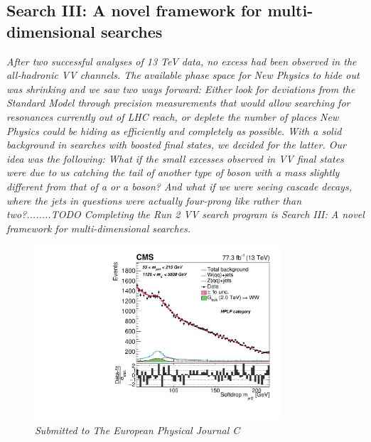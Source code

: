 \vspace*{\fill}


\clearpage

\clearpage

\vspace*{\fill}
\begin{centering}
\section{Search III: A novel framework for multi-dimensional searches}
\label{searchIII}
\textit{
After two successful analyses of 13 TeV data, no excess had been observed in the all-hadronic VV channels. The available phase space for New Physics to hide out was shrinking and we saw two ways forward: Either look for deviations from the Standard Model through precision measurements that would allow searching for resonances currently out of LHC reach, or deplete the number of places New Physics could be hiding as efficiently and completely as possible.
With a solid background in searches with boosted final states, we decided for the latter. Our idea was the following: What if the small excesses observed in VV final states were due to us catching the tail of another type of boson with a mass slightly different from that of a \PW or a \PZ boson? And what if we were seeing cascade decays, where the jets in questions were actually four-prong like rather than two?........TODO
\newline
\newline
Completing the Run 2 VV search program is Search III: A novel framework for multi-dimensional searches.
}
\end{centering}
\begin{figure}[b!]
    \centering
    \includegraphics[height=6.5cm]{figures/analysis/search3/B2G-18-002/PostFitComboHPLP_Y-Proj__x___0_-1_z___0_-1.pdf}
    \vspace*{10mm}
    \caption*{\footnotesize{\textit{Submitted to The European Physical Journal C}}}
\end{figure}


\clearpage




